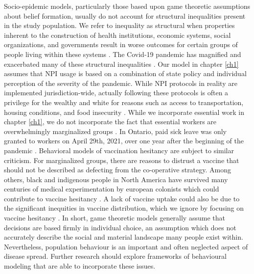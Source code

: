 Socio-epidemic models, particularly those based upon game theoretic assumptions about belief formation, usually do not account for structural inequalities present in the study population. We refer to inequality as structural when properties inherent to the construction of health institutions, economic systems, social organizations, and governments result in worse outcomes for certain groups of people living within these systems \cite{harris2020civil,rahman2018constructing,royce2018poverty}. The Covid-19 pandemic has magnified and exacerbated many of these structural inequalities \cite{anyane2020racial,yaya2020ethnic,chen2021revealing,chen2020covid,bowleg2020we,tuyisenge2021covid,horse2021structural,wang2020health}. Our model in chapter \ref{ch1} assumes that NPI usage is based on a combination of state policy and individual perception of the severity of the pandemic. While NPI protocols in reality are implemented jurisdiction-wide, actually following these protocols is often a privilege for the wealthy and white for reasons such as access to transportation, housing conditions, and food insecurity \cite{jay2020neighbourhood,mamelund2021social}. While we incorporate essential work in chapter \ref{ch1}, we do not incorporate the fact that essential workers are overwhelmingly marginalized groups \cite{lancet2020plight}. In Ontario, paid sick leave was only granted to workers on April 29th, 2021, over one year after the beginning of the pandemic \cite{ontariosickleave}. Behavioral models of vaccination hesitancy are subject to similar criticism. For marginalized groups, there are reasons to distrust a vaccine that should not be described as defecting from the co-operative strategy. Among others, black and indigenous people in North America have survived many centuries of medical experimentation by european colonists \cite{pacheco2013moving,washington2006medical} which could contribute to vaccine hesitancy \cite{jamison2019you,bogart2021covid}. A lack of vaccine uptake could also be due to the significant inequities in vaccine distribution, which we ignore by focusing on vaccine hesitancy \cite{iveniuk2021uneven,osama2021covid,corbie2021vaccine}. In short, game theoretic models generally assume that decisions are based firmly in individual choice, an assumption which does not accurately describe the social and material landscape many people exist within. Nevertheless, population behaviour is an important and often neglected aspect of disease spread. Further research should explore frameworks of behavioural modeling that are able to incorporate these issues. 

